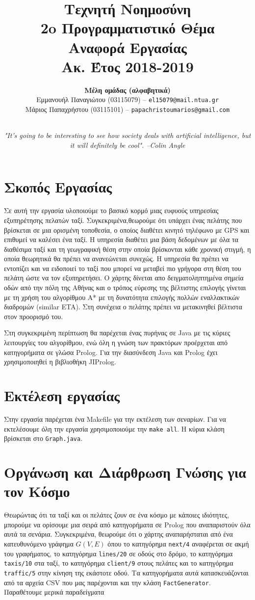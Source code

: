 \documentclass[a4paper,12pt]{article}
\title{ \textbf{Τεχνητή Νοημοσύνη}  \\ 2o Προγραμματιστικό Θέμα \\ Αναφορά Εργασίας \\ \small{Ακ. Έτος 2018-2019}}
\author{\textbf{Μέλη ομάδας (αλφαβητικά)} \\ Εμμανουήλ Παναγιώτου (03115079) -- \texttt{el15079@mail.ntua.gr} \\  Μάριος Παπαχρήστου (03115101) -- \texttt{papachristoumarios@gmail.com} \\ \noindent\rule{0.9\textwidth}{1pt}}
\date{\emph{"It's going to be interesting to see how society deals with artificial intelligence, but it will definitely be cool". --Colin Angle}}
\begin{document}
\maketitle

\section{Σκοπός Εργασίας} 

Σε αυτή την εργασία υλοποιούμε το βασικό κορμό μιας ευφυούς υπηρεσίας εξυπηρέτησης πελατών ταξί. Συγκεκριμένα,θεωρούμε ότι υπάρχει ένας πελάτης που βρίσκεται σε μια ορισμένη τοποθεσία, ο οποίος διαθέτει κινητό τηλέφωνο με GPS και επιθυμεί να καλέσει ένα ταξί. Η υπηρεσία διαθέτει μια βάση δεδομένων με όλα τα διαθέσιμα ταξί και τη γεωγραφική θέση στην
οποία βρίσκονται κάθε χρονική στιγμή, η οποία θεωρητικά θα πρέπει να ανανεώνεται συνεχώς. Η υπηρεσία θα πρέπει να εντοπίζει και να ειδοποιεί το ταξί που μπορεί να μεταβεί πιο γρήγορα στη θέση του πελάτη ώστε να τον εξυπηρετήσει. Ο χάρτης δίνεται απο δειγματοληπτημένα σημεία οδών από την πόλη της Αθήνας και ο τρόπος εύρεσης της βέλτιστης επιλογής γίνεται με τη χρήση του αλγορίθμου Α* με τη δυνατότητα επιλογής πολλών εναλλακτικών διαδρομών (similar ETA).  Στη συνέχεια ο πελάτης πρέπει να μετακινηθεί βέλτιστα στον προορισμό του.

Στη συγκεκριμένη περίπτωση θα παρέχεται ένας πυρήνας σε Java με τις κύριες λειτουργίες του αλγορίθμου, ενώ όλη η γνώση των πρακτόρων προέρχεται από κατηγορήματα σε γλώσα Prolog. Για την διασύνδεση Java και Prolog έχει χρησιμοποιηθεί η βιβλιοθήκη JIProlog. 

\section{Εκτέλεση εργασίας}

Στην εργασία παρέχεται ένα Makefile για την εκτέλεση των σεναρίων. Για να εκτελέσουμε όλη την εργασία χρησιμοποιούμε την \texttt{make all}. Η κύρια κλάση βρίσκεται στο \texttt{Graph.java}. 


\section{Οργάνωση και Διάρθρωση Γνώσης για τον Κόσμο} 

Θεωρώντας ότι τα ταξί και οι πελάτες ζουν σε ένα κόσμο με κάποιες ιδιότητες, μπορούμε να ορίσουμε μια σειρά από κατηγορήματα σε Prolog που αναπαριστούν όλα αυτά τα σενάρια. Συγκεκριμένα, θεωρούμε ότι ο χάρτης αναπαρήσταται από ένα κατευθυνόμενο γράφημα $G(V, E)$ όπου το κατηγόρημα \texttt{next/4} αναφέρεται σε ακμή του γραφήματος, το κατηγόρημα \texttt{lines/20} σε οδούς στο δρόμο, το κατηγόρημα \texttt{taxis/10} στα ταξί, το κατηγόρημα \texttt{client/9} στους πελάτες και το κατηγόρημα \texttt{traffic/5} στην κίνηση της εκάστοτε οδού. Τα κατηγορήματα αυτά κατασκευάζονται από τα αρχεία CSV που μας παρέχονται και την κλάση \texttt{FactGenerator}. Παραθέτουμε μερικά παραδείγματα
\end{document}
